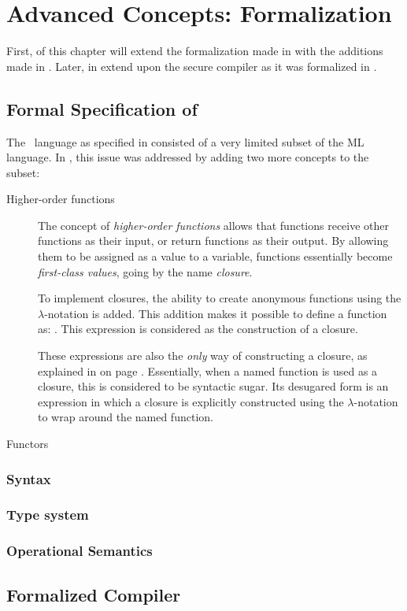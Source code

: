 \chapter{Advanced Concepts: Formalization}

First,  of this chapter will extend the formalization made in  with the additions made in .
Later, in  extend upon the secure compiler as it was formalized in .

\section{Formal Specification of \MiniML}
\label{sec:formalspec2}
The \MiniML\ language as specified in  consisted of a very limited subset of the ML language.
In , this issue was addressed by adding two more concepts to the subset:
\begin{description}
\item[Higher-order functions]
The concept of \emph{higher-order functions} allows that functions receive other functions as their input, or return functions as their output.
By allowing them to be assigned as a value to a variable, functions essentially become \emph{first-class values}, going by the name \emph{closure}.

To implement closures, the ability to create anonymous functions using the $\lambda$-notation is added.
This addition makes it possible to define a function as: .
This expression is considered as the construction of a closure.

These expressions are also the \emph{only} way of constructing a closure, as explained in  on page \pageref{sec:OnlyLambdaClosures}. 
Essentially, when a named function is used as a closure, this is considered to be syntactic sugar.
Its desugared form is an expression in which a closure is explicitly constructed using the $\lambda$-notation to wrap around the named function.

\item[Functors] 


\end{description}

\subsection{Syntax}
\subsection{Type system}
\subsection{Operational Semantics}

\section{Formalized Compiler}
\label{sec:formalizedcompiler2}